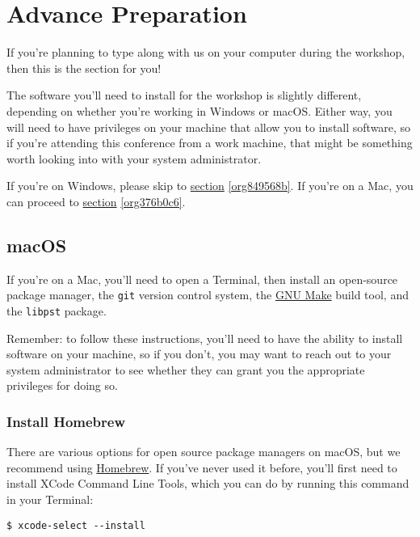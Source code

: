 \documentclass[11pt]{article}
\begin{document}
\section{Advance Preparation \label{org52c9835}}
\label{sec:orgd416f73}

If you're planning to type along with us on your computer during the
workshop, then this is the section for you!

The software you'll need to install for the workshop is slightly
different, depending on whether you're working in Windows or macOS.
Either way, you will need to have privileges on your machine that
allow you to install software, so if you're attending this conference
from a work machine, that might be something worth looking into with
your system administrator.

If you're on Windows, please skip to \hyperref[org849568b]{section} \ref{org849568b}.  If you're on a
Mac, you can proceed to \hyperref[org376b0c6]{section} \ref{org376b0c6}.

\subsection{macOS \label{org376b0c6}}
\label{sec:org3a14e66}

If you're on a Mac, you'll need to open a Terminal, then install an
open-source package manager, the \texttt{git} version control system, the \href{https://www.gnu.org/software/make/}{GNU
Make} build tool, and the \texttt{libpst} package.  

Remember: to follow these instructions, you'll need to have the
ability to install software on your machine, so if you don't, you may
want to reach out to your system administrator to see whether they can
grant you the appropriate privileges for doing so.

\subsubsection{Install Homebrew}
\label{sec:org396082a}

There are various options for open source package managers on macOS,
but we recommend using \href{https://brew.sh}{Homebrew}.  If you've never used it
before, you'll first need to install XCode Command Line Tools, which
you can do by running this command in your Terminal:

\begin{verbatim}
$ xcode-select --install
\end{verbatim}
\end{document}
